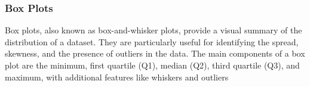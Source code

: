 \subsubsection{Box Plots}

Box plots, also known as box-and-whisker plots, provide a visual summary of the distribution of a dataset. They are particularly useful for identifying the spread, skewness, and the presence of outliers in the data. The main components of a box plot are the minimum, first quartile (Q1), median (Q2), third quartile (Q3), and maximum, with additional features like whiskers and outliers
